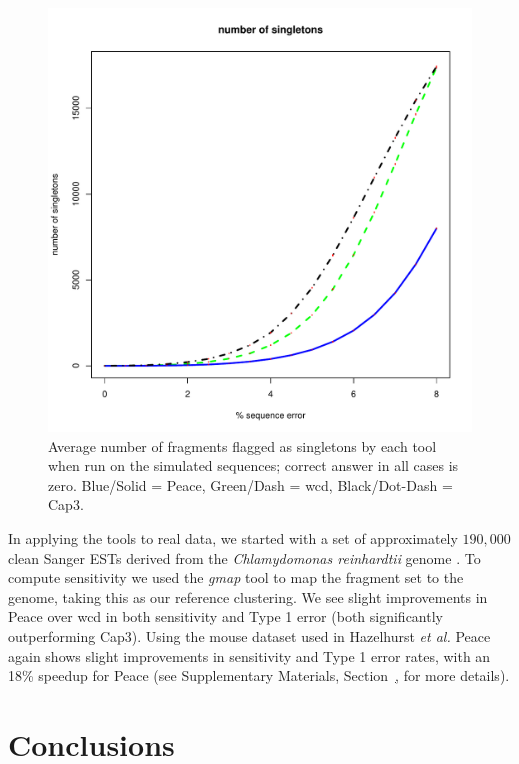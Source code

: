 \documentclass[a4,center,fleqn]{NAR}
\begin{document}
\begin{figure}[b]
\begin{minipage}{2in}
\centerline{
\includegraphics[scale=0.35]{pics.d/singletons.pdf}
}
\end{minipage}
\label{singletons}
\caption{Average number of fragments flagged as singletons by each tool
  when run on the simulated sequences; correct answer in all cases is
  zero.  Blue/Solid = {\sc Peace}, Green/Dash = {\sc wcd},
  Black/Dot-Dash = {\sc Cap3}.}
\end{figure}

In applying the tools to real data, we started with a set of
approximately $190,000$ clean Sanger ESTs derived from the {\it
  Chlamydomonas reinhardtii} genome \cite{Liang2008}.  To compute
sensitivity we used the {\it gmap} tool \cite{Wu05} to map the
fragment set to the genome, taking this as our reference clustering.
We see slight improvements in {\sc Peace} over {\sc wcd} in both
sensitivity and Type 1 error (both significantly outperforming {\sc
  Cap3}).  Using the mouse dataset used in Hazelhurst {\it et
  al.}  \cite{Hazelhurst08a} {\sc Peace} again shows slight
improvements in sensitivity and Type 1 error rates, with an 18\% speedup
for {\sc Peace} (see Supplementary Materials,
Section~\href{real_results}, for more details).

\section{Conclusions}
\end{document}
